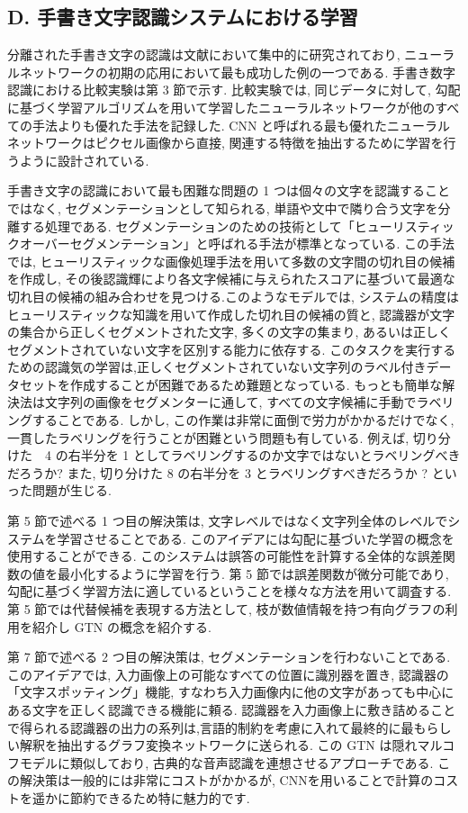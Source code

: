 \documentclass[twocolumn]{jarticle}     %
\begin{document}
\subsection*{D. 手書き文字認識システムにおける学習}
分離された手書き文字の認識は文献において集中的に研究されており, 
ニューラルネットワークの初期の応用において最も成功した例の一つである. 手書き数字認識における比較実験は第 3 節で示す.
比較実験では, 同じデータに対して, 勾配に基づく学習アルゴリズムを用いて学習したニューラルネットワークが他のすべての手法よりも優れた手法を記録した. CNN と呼ばれる最も優れたニューラルネットワークはピクセル画像から直接, 関連する特徴を抽出するために学習を行うように設計されている.\par
手書き文字の認識において最も困難な問題の 1 つは個々の文字を認識することではなく, セグメンテーションとして知られる, 単語や文中で隣り合う文字を分離する処理である.
セグメンテーションのための技術として「ヒューリスティックオーバーセグメンテーション」と呼ばれる手法が標準となっている.
この手法では, ヒューリスティックな画像処理手法を用いて多数の文字間の切れ目の候補を作成し, その後認識輝により各文字候補に与えられたスコアに基づいて最適な切れ目の候補の組み合わせを見つける.このようなモデルでは, システムの精度はヒューリスティックな知識を用いて作成した切れ目の候補の質と, 認識器が文字の集合から正しくセグメントされた文字, 多くの文字の集まり, あるいは正しくセグメントされていない文字を区別する能力に依存する. このタスクを実行するための認識気の学習は,正しくセグメントされていない文字列のラベル付きデータセットを作成することが困難であるため難題となっている.
もっとも簡単な解決法は文字列の画像をセグメンターに通して, すべての文字候補に手動でラベリングすることである. しかし, この作業は非常に面倒で労力がかかるだけでなく, 一貫したラベリングを行うことが困難という問題も有している.
例えば, 切り分けた　4 の右半分を 1 としてラベリングするのか文字ではないとラベリングべきだろうか? また, 切り分けた 8 の右半分を 3 とラベリングすべきだろうか ? といった問題が生じる.
\par
第 5 節で述べる 1 つ目の解決策は, 文字レベルではなく文字列全体のレベルでシステムを学習させることである. このアイデアには勾配に基づいた学習の概念を使用することができる. このシステムは誤答の可能性を計算する全体的な誤差関数の値を最小化するように学習を行う. 第 5 節では誤差関数が微分可能であり, 勾配に基づく学習方法に適しているということを様々な方法を用いて調査する.
第 5 節では代替候補を表現する方法として, 枝が数値情報を持つ有向グラフの利用を紹介し GTN の概念を紹介する.
\par
第 7 節で述べる 2 つ目の解決策は, セグメンテーションを行わないことである.このアイデアでは, 入力画像上の可能なすべての位置に識別器を置き, 認識器の「文字スポッティング」機能, すなわち入力画像内に他の文字があっても中心にある文字を正しく認識できる機能に頼る.
認識器を入力画像上に敷き詰めることで得られる認識器の出力の系列は,言語的制約を考慮に入れて最終的に最もらしい解釈を抽出するグラフ変換ネットワークに送られる. この GTN は隠れマルコフモデルに類似しており, 古典的な音声認識を連想させるアプローチである. この解決策は一般的には非常にコストがかかるが,  CNNを用いることで計算のコストを遥かに節約できるため特に魅力的です.
\end{document}
